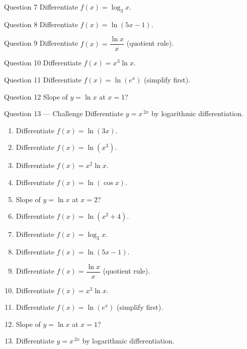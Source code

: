 \documentclass[11pt]{article}
\begin{document}
\begin{qbox}{Question 7}
Differentiate $f(x)=\log_3 x$.\workspace{2.4cm}
\end{qbox}

\begin{qbox}{Question 8}
Differentiate $f(x)=\ln(5x-1)$.\workspace{2.4cm}
\end{qbox}

\begin{qbox}{Question 9}
Differentiate $f(x)=\dfrac{\ln x}{x}$ (quotient rule).\workspace{2.4cm}
\end{qbox}

\begin{qbox}{Question 10}
Differentiate $f(x)=x^3\ln x$.\workspace{2.4cm}
\end{qbox}

\begin{qbox}{Question 11}
Differentiate $f(x)=\ln(e^x)$ (simplify first).\workspace{2.4cm}
\end{qbox}

\begin{qbox}{Question 12}
Slope of $y=\ln x$ at $x=1$?\workspace{2.4cm}
\end{qbox}

\begin{qbox}{Question 13 --- Challenge}
Differentiate $y=x^{\,2x}$ by logarithmic differentiation.\workspace{3.5cm}
\end{qbox}

\clearpage
{}

\begin{recapbox}
\begin{multicols}{2}
\small
\begin{enumerate}[leftmargin=*,itemsep=3pt]
  \item Differentiate $f(x)=\ln(3x)$.
  \item Differentiate $f(x)=\ln(x^3)$.
  \item Differentiate $f(x)=x^2\ln x$.
  \item Differentiate $f(x)=\ln(\cos x)$.
  \item Slope of $y=\ln x$ at $x=2$?
  \item Differentiate $f(x)=\ln(x^2+4)$.
  \item Differentiate $f(x)=\log_3 x$.
  \item Differentiate $f(x)=\ln(5x-1)$.
  \item Differentiate $f(x)=\dfrac{\ln x}{x}$ (quotient rule).
  \item Differentiate $f(x)=x^3\ln x$.
  \item Differentiate $f(x)=\ln(e^x)$ (simplify first).
  \item Slope of $y=\ln x$ at $x=1$?
  \item Differentiate $y=x^{\,2x}$ by logarithmic differentiation.
\end{enumerate}
\end{multicols}
\end{recapbox}
\end{document}
